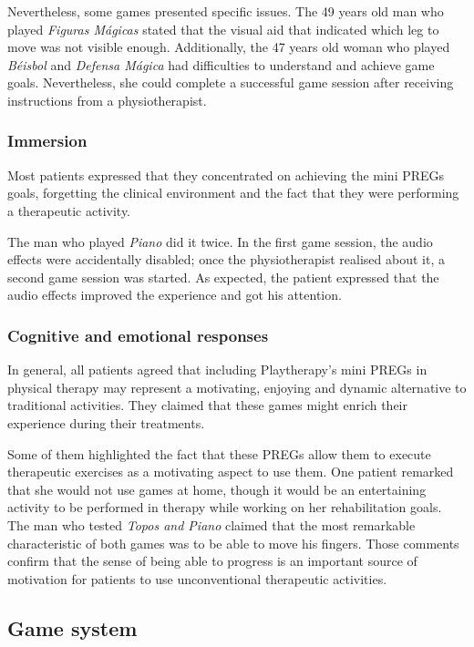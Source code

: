 Nevertheless, some games presented specific issues. The 49 years old man who played \textit{Figuras M\'agicas} stated that the visual aid that indicated which leg to move was not visible enough. Additionally, the 47 years old woman who played \textit{B\'eisbol} and \textit{Defensa M\'agica} had difficulties to understand and achieve game goals. Nevertheless, she could complete a successful game session after receiving instructions from a physiotherapist.

\subsubsection*{Immersion}
Most patients expressed that they concentrated on achieving the mini \acp{PREG} goals, forgetting the clinical environment and the fact that they were performing a therapeutic activity.

The man who played \textit{Piano} did it twice. In the first game session, the audio effects were accidentally disabled; once the physiotherapist realised about it, a second game session was started. As expected, the patient expressed that the audio effects improved the experience and got his attention.

\subsubsection{Cognitive and emotional responses}
In general, all patients agreed that including Playtherapy's mini \acp{PREG} in physical therapy may represent a motivating, enjoying and dynamic alternative to traditional activities. They claimed that these games might enrich their experience during their treatments.

Some of them highlighted the fact that these \acp{PREG} allow them to execute therapeutic exercises as a motivating aspect to use them. One patient remarked that she would not use games at home, though it would be an entertaining activity to be performed in therapy while working on her rehabilitation goals. The man who tested \textit{Topos and Piano} claimed that the most remarkable characteristic of both games was to be able to move his fingers. Those comments confirm that the sense of being able to progress is an important source of motivation for patients to use unconventional therapeutic activities.

\subsection{Game system}
